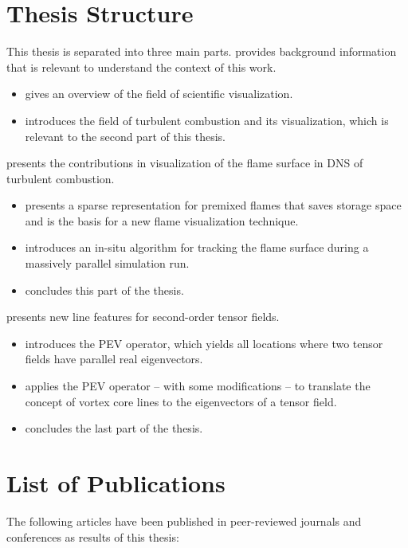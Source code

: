 \section{Thesis Structure} %
\label{sec:thesis_structure}
%
This thesis is separated into three main parts.
%
 provides background information that is relevant to
understand the context of this work.
%
\begin{itemize}
    \item {} gives an overview of the field of scientific
    visualization.
    \item {} introduces the field of turbulent
    combustion and its visualization, which is relevant to the second part of
    this thesis.
\end{itemize}
%
%
 presents the contributions in visualization of the flame
surface in \ac{DNS} of turbulent combustion.
%
\begin{itemize}
    \item {} presents a sparse representation
    for premixed flames that saves storage space and is the basis for a new
    flame visualization technique.
    \item {} introduces an in-situ algorithm for
    tracking the flame surface during a massively parallel simulation run.
    \item {} concludes this part of the thesis.
\end{itemize}
%
%
 presents new line features for second-order tensor
fields.
%
\begin{itemize}
    \item {} introduces the \ac{PEV} operator,
    which yields all locations where two tensor fields have parallel real
    eigenvectors.
    \item {} applies the \ac{PEV} operator -- with
    some modifications -- to translate the concept of vortex core lines to the
    eigenvectors of a tensor field.
    \item {} concludes the last part of the
    thesis.
\end{itemize}
%
%
\clearpage
\section{List of Publications} %
\label{sec:list_of_publications}
%
The following articles have been published in peer-reviewed journals and
conferences as results of this thesis:
%
%

